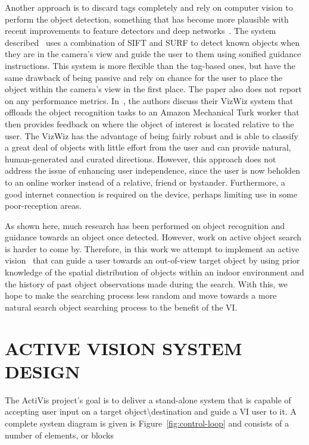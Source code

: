 \documentclass[a4paper, twoside]{article}
\begin{document}
Another approach is to discard tags completely and rely on computer vision to perform the object detection, something that has become more plausible with recent improvements to feature detectors and deep networks~\cite{huang2017speed,redmon2016you}. The system described~\cite{schauerte2012assistive} uses a combination of SIFT and SURF to detect known objects when they are in the camera's view and guide the user to them using sonified guidance instructions. This system is more flexible than the tag-based ones, but have the same drawback of being passive and rely on chance for the user to place the object within the camera's view in the first place. The paper also does not report on any performance metrics. In~\cite{bigham2010vizwiz}, the authors discuss their VizWiz system that offloads the object recognition tasks to an Amazon Mechanical Turk worker that then provides feedback on where the object of interest is located relative to the user. The VizWiz has the advantage of being fairly robust and is able to classify a great deal of objects with little effort from the user and can provide natural, human-generated and curated directions. However, this approach does not address the issue of enhancing user independence, since the user is now beholden to an online worker instead of a relative, friend or bystander. Furthermore, a good internet connection is required on the device, perhaps limiting use in some poor-reception areas.

As shown here, much research has been performed on object recognition and guidance towards an object once detected. However, work on active object search is harder to come by. Therefore, in this work we attempt to implement an active vision~\cite{aloimonos1988active,bellotto2013,lock2017portable} that can guide a user towards an out-of-view target object by using prior knowledge of the spatial distribution of objects within an indoor environment and the history of past object observations made during the search. With this, we hope to make the searching process less random and move towards a more natural search object searching process to the benefit of the VI\@.  

\section{\uppercase{Active Vision System Design}}\label{sec:system-design}

\noindent The ActiVis project's goal is to deliver a stand-alone system that is capable of accepting user input on a target object\textbackslash{}destination and guide a VI user to it. A complete system diagram is given is Figure~\ref{fig:control-loop} and consists of a number of elements, or blocks
\end{document}
